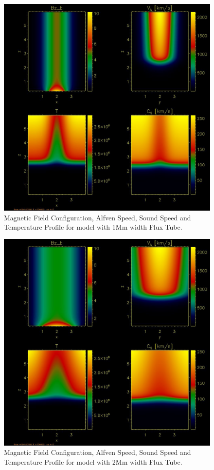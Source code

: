 \documentclass{aa}
\begin{document}
\begin{figure}[h]
\includegraphics[scale=0.5]{images/s4b0_b2_4field_3d00000.jpg}
\caption{Magnetic Field Configuration, Alfven Speed, Sound Speed and Temperature Profile for model with 1Mm width Flux Tube. }
\end{figure}



\begin{figure}[h]
\includegraphics[scale=0.5]{images/s4b0_b4_4field_3d00000.jpg}
\caption{Magnetic Field Configuration, Alfven Speed, Sound Speed and Temperature Profile for model with 2Mm width Flux Tube. }
\end{figure}
\end{document}

